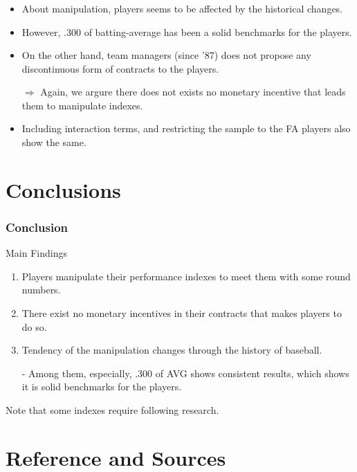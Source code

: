 \documentclass[dvipdfmx,12pt]{beamer}
\begin{document}
\begin{frame}\frametitle{}
  \begin{itemize}
    \item About manipulation, players seems to be affected by the historical changes.

    \item However, .300 of batting-average has been a solid benchmarks for the players.

    \item On the other hand, team managers (since '87) does not propose any discontinuous form of contracts to the players.

    $\Rightarrow$ Again, we argure there does not exists no monetary incentive that leads them to manipulate indexes.

    \item Including interaction terms, and restricting the sample to the FA players also show the same.
  \end{itemize}
\end{frame}

\section{Conclusions}
\begin{frame}\frametitle{Conclusion}
  Main Findings
  \begin{enumerate}
    \item Players manipulate their performance indexes to meet them with some round numbers.

    \item There exist no monetary incentives in their contracts that makes players to do so.

    \item Tendency of the manipulation changes through the history of baseball.

    - Among them, especially, .300 of AVG shows consistent results, which shows it is solid benchmarks for the players.
  \end{enumerate}

  Note that some indexes require following research.
\end{frame}

\section*{Reference and Sources}
\end{document}
